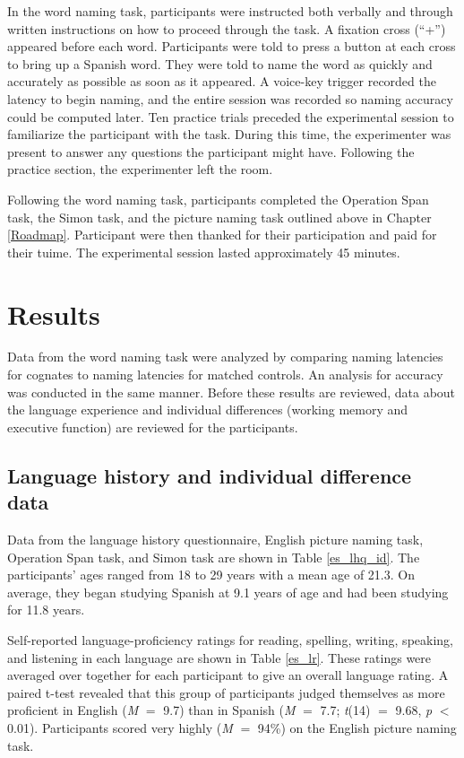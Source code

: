 In the word naming task, participants were instructed both verbally and through written instructions on how to proceed through the task. A fixation cross (``+'') appeared before each word. Participants were told to press a button at each cross to bring up a Spanish word. They were told to name the word as quickly and accurately as possible as soon as it appeared. A voice-key trigger recorded the  latency to begin naming, and the entire session was recorded so naming accuracy could be computed later.  Ten practice trials preceded the experimental session to familiarize the participant with the task. During this time, the experimenter was present to answer any questions the participant might have. Following the practice section, the experimenter left the room. 

Following the word naming task, participants completed the Operation Span task, the Simon task, and the picture naming task outlined above in Chapter \ref{Roadmap}. Participant were then thanked for their participation and paid for their tuime. The experimental session lasted approximately 45 minutes.

\section{Results}
Data from the word naming task were analyzed by comparing naming latencies for cognates to naming latencies for matched controls. An analysis for accuracy was conducted in the same manner. Before these results are reviewed, data about the language experience and individual differences (working memory and executive function) are reviewed for the participants.

\subsection{Language history and individual difference data}
Data from the language history questionnaire, English picture naming task, Operation Span task, and Simon task  are shown in Table \ref{es_lhq_id}. The participants' ages ranged from 18 to 29 years with a mean age of 21.3. On average, they  began studying Spanish at 9.1 years of age  and had been studying for 11.8 years. 




Self-reported language-proficiency ratings for reading, spelling, writing, speaking, and listening in each language are shown in Table \ref{es_lr}. These ratings were averaged over together for each participant to give an overall language rating. A paired t-test revealed that this group of participants judged themselves as more proficient in English (\textit{M} $=$ 9.7) than in Spanish (\textit{M} $=$ 7.7; \textit{t}(14) $=$ 9.68, \textit{p} $<$ 0.01). Participants scored very highly (\textit{M} $=$ 94\%) on the English picture naming task.  

